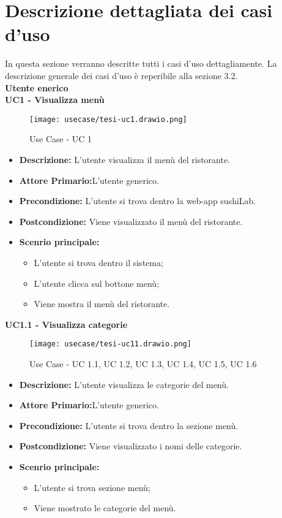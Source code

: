
\chapter{Descrizione dettagliata dei casi d'uso}
\label{cap:appendice a}
In questa sezione verranno descritte tutti i casi d'uso dettagliamente.
La descrizione generale dei casi d'uso è reperibile alla sezione 3.2.\\
\textbf{Utente enerico}\\
\textbf{UC1 - Visualizza menù}
\begin{figure}[H]
    \centering
    \texttt{[image: usecase/tesi-uc1.drawio.png]}
    \caption{Use Case - UC 1}
\end{figure}
\begin{itemize}
    \item \textbf{Descrizione:} L'utente visualizza il menù del ristorante.
    \item \textbf{Attore Primario:}L'utente generico.
    \item \textbf{Precondizione:} L'utente si trova dentro la web-app sushiLab.
    \item \textbf{Postcondizione:} Viene visualizzato il menù del ristorante.
    \item \textbf{Scenrio principale:}
    \begin{itemize}
        \item L'utente si trova dentro il sistema;
        \item L'utente clicca sul bottone menù;
        \item Viene mostra il menù del ristorante.
    \end{itemize}
\end{itemize}
\textbf{UC1.1 - Visualizza categorie}
\begin{figure}[H]
    \centering
    \texttt{[image: usecase/tesi-uc11.drawio.png]}
    \caption{Use Case - UC 1.1, UC 1.2, UC 1.3, UC 1.4, UC 1.5, UC 1.6}
\end{figure}
\begin{itemize}
    \item \textbf{Descrizione:} L'utente visualizza le categorie del menù.
    \item \textbf{Attore Primario:}L'utente generico.
    \item \textbf{Precondizione:} L'utente si trova dentro la sezione menù.
    \item \textbf{Postcondizione:} Viene visualizzato i nomi delle categorie.
    \item \textbf{Scenrio principale:}
    \begin{itemize}
        \item L'utente si trova sezione menù;
        \item Viene mostrato le categorie del menù.
    \end{itemize}
\end{itemize}

